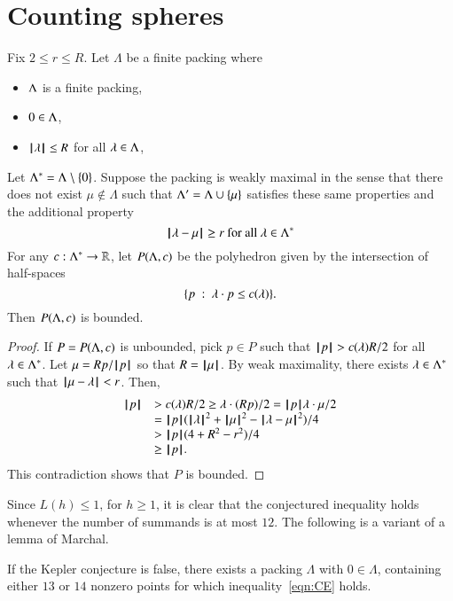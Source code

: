 \section{Counting spheres}

\begin{lemma}\label{lemma:poly-bounded} 
Fix $2\le r\le R$.
Let $\Lambda$ be a finite packing where 
\begin{itemize}
  \item $\Lambda$ is a finite packing, 
  \item $0\in\Lambda$,
  \item ${{\hskip0.1em|\hskip-0.15em|\hskip0.1em}\lambda{\hskip0.1em|\hskip-0.15em|\hskip0.1em}}\le R$ for all $\lambda\in\Lambda$,
\end{itemize}
Let $\Lambda^*=\Lambda\setminus\{0\}$.
Suppose the packing is weakly maximal in the sense that there does not exist $\mu\not\in\Lambda$ such that $\Lambda'=\Lambda\cup\{\mu\}$ satisfies these same properties
and the additional property
 $$
{\hskip0.1em|\hskip-0.15em|\hskip0.1em}\lambda - \mu{\hskip0.1em|\hskip-0.15em|\hskip0.1em}\ge r \text{ for all } \lambda\in\Lambda^*
 $$
For any $c:\Lambda^*\to\mathbb{R}$, let $P(\Lambda,c)$ be the
polyhedron given by the intersection of half-spaces
$$
\{p \ :\  \lambda\cdot p \le c(\lambda)\}.
$$
Then $P(\Lambda,c)$ is bounded.
\end{lemma}

\begin{proof}  If $P=P(\Lambda,c)$ is unbounded, pick $p\in P$ such that
${{\hskip0.1em|\hskip-0.15em|\hskip0.1em}p{\hskip0.1em|\hskip-0.15em|\hskip0.1em}} > c(\lambda) R/2$ for all $\lambda\in\Lambda^*$.  Let $\mu =  R p/{{\hskip0.1em|\hskip-0.15em|\hskip0.1em}p{\hskip0.1em|\hskip-0.15em|\hskip0.1em}}$ so that $R={{\hskip0.1em|\hskip-0.15em|\hskip0.1em}\mu{\hskip0.1em|\hskip-0.15em|\hskip0.1em}}$.  By weak maximality, there exists $\lambda\in\Lambda^*$ such that ${\hskip0.1em|\hskip-0.15em|\hskip0.1em}\mu - \lambda{\hskip0.1em|\hskip-0.15em|\hskip0.1em}<r$.    Then,
$$
\begin{array}{lll}
\normo{p} &> c(\lam) R/2 \ge \lam\cdot (R p)/2 = \normo{p} \lam\cdot \mu /2\\
  &= \normo{p} (\normo{\lam}^2 + \normo{\mu}^2 - \norm{\lam}{\mu}^2)/4\\
  &> \normo{p}(4+R^2-r^2)/4\\
  &\ge \normo{p}.
\end{array}
$$
This contradiction shows that $P$ is bounded.
\end{proof}




Since $L(h)\le 1$, for $h\ge1$, it is clear that the conjectured inequality holds whenever the number of summands is at most $12$. The following is a variant of a lemma of Marchal.


\begin{lemma}\label{lemma:13-14}  
If the Kepler conjecture is false, there exists a packing $\Lambda$ with $0\in\Lambda$, containing either $13$ or $14$ nonzero points for which inequality~\ref{eqn:CE} holds.
\end{lemma}


